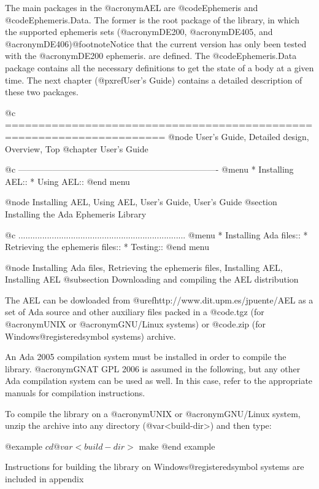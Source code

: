 The main packages in the @acronym{AEL} are @code{Ephemeris} and
@code{Ephemeris.Data}. The former is the root package of the library,
in which the supported ephemeris sets (@acronym{DE200},
@acronym{DE405}, and @acronym{DE406})@footnote{Notice that the current
version has only been tested with the @acronym{DE200} ephemeris.} are
defined.  The @code{Ephemeris.Data} package contains all the necessary
definitions to get the state of a body at a given time. The next
chapter (@pxref{User's Guide}) contains a detailed description of
these two packages.

@c ======================================================================
@node  User's Guide, Detailed design, Overview, Top
@chapter User's Guide 

@c ----------------------------------------------------------------------
@menu
* Installing AEL::              
* Using AEL::                   
@end menu

@node Installing AEL, Using AEL, User's Guide, User's Guide
@section Installing the Ada Ephemeris Library

@c ......................................................................
@menu
* Installing Ada files::        
* Retrieving the ephemeris files::  
* Testing::                     
@end menu

@node Installing Ada files, Retrieving the ephemeris files, Installing AEL, Installing AEL
@subsection Downloading and compiling the AEL distribution

The AEL can be dowloaded from @uref{http://www.dit.upm.es/jpuente/AEL}
as a set of Ada source and other auxiliary files packed in a
@code{.tgz} (for @acronym{UNIX} or @acronym{GNU}/Linux systems) or
@code{.zip} (for Windows@registeredsymbol{} systems) archive.

An Ada 2005 compilation system must be installed in order to compile
the library. @acronym{GNAT GPL 2006} is assumed in the following, but
any other Ada compilation system can be used as well. In this case,
refer to the appropriate manuals for compilation instructions.

To compile the library on a @acronym{UNIX} or @acronym{GNU}/Linux system,
unzip the archive into any directory (@var{<build-dir>}) and then type:

@example
$ cd @var{<build-dir>}
$ make
@end example

Instructions for building the library on Windows@registeredsymbol{}
systems are included in appendix 




